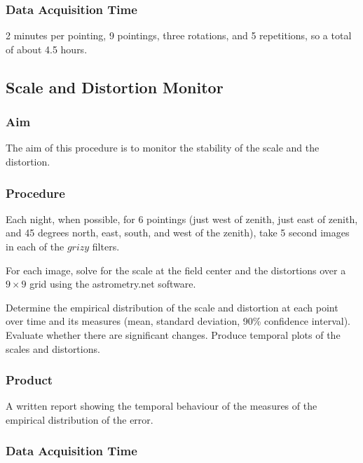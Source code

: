 \documentclass{article}
\begin{document}
\subsubsection{Data Acquisition Time}

2 minutes per pointing, 9 pointings, three rotations, and 5 repetitions, so a total of about 4.5 hours.


\subsection{Scale and Distortion Monitor}

\subsubsection{Aim}

The aim of this procedure is to monitor the stability of the scale and the distortion.

\subsubsection{Procedure}

Each night, when possible, for 6 pointings (just west of zenith, just east of zenith, and 45 degrees north, east, south, and west of the zenith), take 5 second images in each of the $grizy$ filters.

For each image, solve for the scale at the field center and the distortions over a $9\times9$ grid using the astrometry.net software.

Determine the empirical distribution of the scale and distortion at each point over time and its measures (mean, standard deviation, 90\% confidence interval). Evaluate whether there are significant changes. Produce temporal plots of the scales and distortions.

\subsubsection{Product}

A written report showing the temporal behaviour of the measures of the empirical distribution of the error. 

\subsubsection{Data Acquisition Time}
\end{document}
